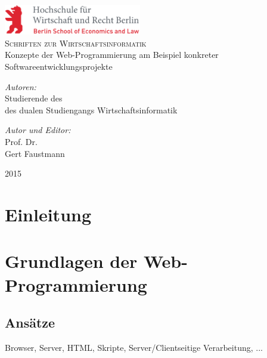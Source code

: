 \documentclass[11pt,a4paper,ngerman]{book}
\begin{document}
\begin{titlepage}
\begin{center}
\includegraphics[width=0.45\textwidth]{./hwr-logo}\\[2cm]

\textsc{\Large Schriften zur Wirtschaftsinformatik}
\\[2cm]

{\Huge Konzepte der Web-Programmierung am Beispiel konkreter Softwareentwicklungsprojekte} 
\\[2cm]

\begin{minipage}{0.4\textwidth}
\begin{flushleft} \large
\emph{Autoren:} \\
Studierende des \\ 
des dualen Studiengangs Wirtschaftsinformatik 
\end{flushleft}
\end{minipage}
\begin{minipage}{0.4\textwidth}
\begin{flushright} \large
\emph{Autor und Editor:}\\
Prof. Dr. \\ Gert Faustmann
\end{flushright}
\end{minipage}

\vfill
2015
\end{center}
\end{titlepage}


\chapter{Einleitung}

\chapter{Grundlagen der Web-Programmierung}
\section{Ansätze}
Browser, Server, HTML, Skripte, Server/Clientseitige Verarbeitung, ...
\end{document}

